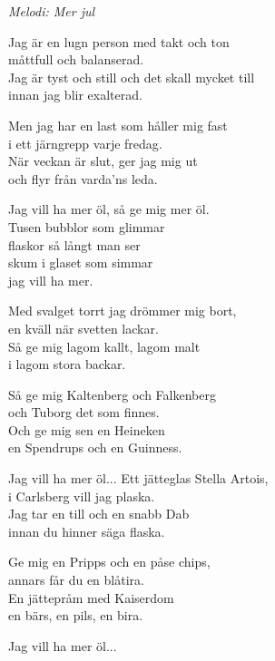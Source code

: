 {\footnotesize\textit{Melodi: Mer jul}}\par
\vspace{10pt}
Jag är en lugn person med takt och ton\\
måttfull och balanserad.\\
Jag är tyst och still och det skall mycket till\\
innan jag blir exalterad.\par
\vspace{10pt}
Men jag har en last som håller mig fast\\
i ett järngrepp varje fredag.\\
När veckan är slut, ger jag mig ut\\
och flyr från varda'ns leda.\par
\vspace{10pt}
\revrpt Jag vill ha mer öl, så ge mig mer öl.\rpt\\
Tusen bubblor som glimmar\\
flaskor så långt man ser\\
skum i glaset som simmar\\
jag vill ha mer.\par
\vspace{10pt}
Med svalget torrt jag drömmer mig bort,\\
en kväll när svetten lackar.\\
Så ge mig lagom kallt, lagom malt\\
i lagom stora backar.\par
\vspace{10pt}
Så ge mig Kaltenberg och Falkenberg\\
och Tuborg det som finnes.\\
Och ge mig sen en Heineken\\
en Spendrups och en Guinness.\par
\vspace{10pt}
Jag vill ha mer öl...
\newpage
Ett jätteglas Stella Artois,\\
i Carlsberg vill jag plaska.\\
Jag tar en till och en snabb Dab\\
innan du hinner säga flaska.\par
\vspace{10pt}
Ge mig en Pripps och en påse chips,\\
annars får du en blåtira.\\
En jättepråm med Kaiserdom\\
en bärs, en pils, en bira.\par
\vspace{10pt}
Jag vill ha mer öl...
